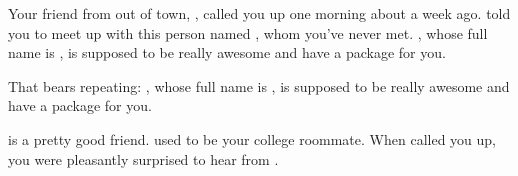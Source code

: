 \documentclass[char]{testgame}
\begin{document}
\name{\cTest{}}

\updatemacro{\cNPC}{
  \unknownplayer %
}





Your friend from out of town, \cSomeGuy{\intro}, called you up one
morning about a week ago.  \cSomeGuy{} told you to meet up with this
person named \cNPC{}, whom you've never met.  \cNPC{}, whose full name
is \cNPC{\intro}, is supposed to be really awesome and have a package
for you.

That bears repeating: \cNPC{\nick{\informal}}, whose full name is
\cNPC{\full}, is supposed to be really awesome and have a package for
you.

\cSomeGuy{} is a pretty good friend.  \cSomeGuy{\They} used to be your
college roommate.  When \cSomeGuy{\they} called you up, you were
pleasantly surprised to hear from \cSomeGuy{\them}.
\end{document}
